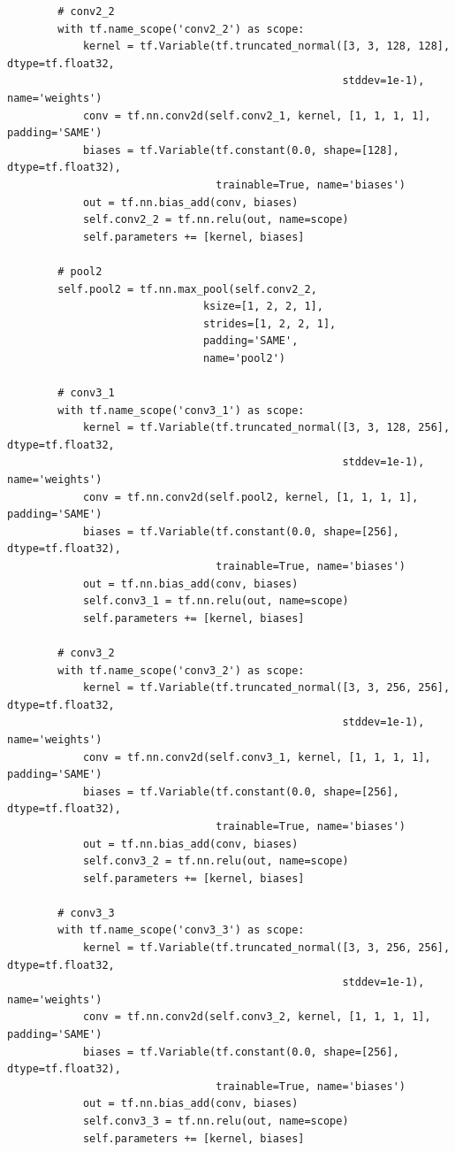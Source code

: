 \documentclass[11pt,a4paper]{article}
\begin{document}
\begin{verbatim}
        # conv2_2
        with tf.name_scope('conv2_2') as scope:
            kernel = tf.Variable(tf.truncated_normal([3, 3, 128, 128], dtype=tf.float32,
                                                     stddev=1e-1), name='weights')
            conv = tf.nn.conv2d(self.conv2_1, kernel, [1, 1, 1, 1], padding='SAME')
            biases = tf.Variable(tf.constant(0.0, shape=[128], dtype=tf.float32),
                                 trainable=True, name='biases')
            out = tf.nn.bias_add(conv, biases)
            self.conv2_2 = tf.nn.relu(out, name=scope)
            self.parameters += [kernel, biases]

        # pool2
        self.pool2 = tf.nn.max_pool(self.conv2_2,
                               ksize=[1, 2, 2, 1],
                               strides=[1, 2, 2, 1],
                               padding='SAME',
                               name='pool2')

        # conv3_1
        with tf.name_scope('conv3_1') as scope:
            kernel = tf.Variable(tf.truncated_normal([3, 3, 128, 256], dtype=tf.float32,
                                                     stddev=1e-1), name='weights')
            conv = tf.nn.conv2d(self.pool2, kernel, [1, 1, 1, 1], padding='SAME')
            biases = tf.Variable(tf.constant(0.0, shape=[256], dtype=tf.float32),
                                 trainable=True, name='biases')
            out = tf.nn.bias_add(conv, biases)
            self.conv3_1 = tf.nn.relu(out, name=scope)
            self.parameters += [kernel, biases]

        # conv3_2
        with tf.name_scope('conv3_2') as scope:
            kernel = tf.Variable(tf.truncated_normal([3, 3, 256, 256], dtype=tf.float32,
                                                     stddev=1e-1), name='weights')
            conv = tf.nn.conv2d(self.conv3_1, kernel, [1, 1, 1, 1], padding='SAME')
            biases = tf.Variable(tf.constant(0.0, shape=[256], dtype=tf.float32),
                                 trainable=True, name='biases')
            out = tf.nn.bias_add(conv, biases)
            self.conv3_2 = tf.nn.relu(out, name=scope)
            self.parameters += [kernel, biases]

        # conv3_3
        with tf.name_scope('conv3_3') as scope:
            kernel = tf.Variable(tf.truncated_normal([3, 3, 256, 256], dtype=tf.float32,
                                                     stddev=1e-1), name='weights')
            conv = tf.nn.conv2d(self.conv3_2, kernel, [1, 1, 1, 1], padding='SAME')
            biases = tf.Variable(tf.constant(0.0, shape=[256], dtype=tf.float32),
                                 trainable=True, name='biases')
            out = tf.nn.bias_add(conv, biases)
            self.conv3_3 = tf.nn.relu(out, name=scope)
            self.parameters += [kernel, biases]


\end{verbatim}
\end{document}
